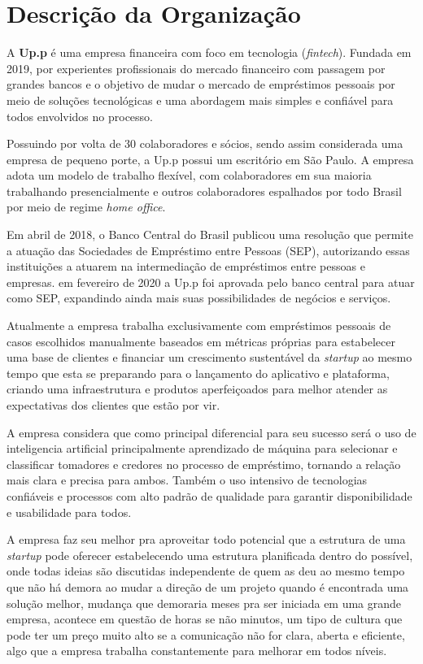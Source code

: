 \documentclass{ufscar}
\begin{document}
\section{Descrição da Organização}

A \textbf{Up.p} é uma empresa financeira com foco em tecnologia (\textit{fintech}). Fundada em 2019, por experientes profissionais do mercado financeiro com passagem por grandes bancos e o objetivo de mudar o mercado de empréstimos pessoais por meio de soluções tecnológicas e uma abordagem mais simples e confiável para todos envolvidos no processo.%

Possuindo por volta de 30 colaboradores e sócios, sendo assim considerada uma empresa de pequeno porte, a Up.p possui um escritório em São Paulo. A empresa adota um modelo de trabalho flexível, com colaboradores em sua maioria trabalhando presencialmente  e outros colaboradores espalhados por todo Brasil por meio de regime \textit{home office}.

Em abril de 2018, o Banco Central do Brasil publicou uma resolução que permite a atuação das Sociedades de Empréstimo entre Pessoas (SEP), autorizando essas instituições a atuarem na intermediação de empréstimos entre pessoas e empresas. em fevereiro de 2020 a Up.p foi aprovada pelo banco central para atuar como SEP, expandindo ainda mais suas possibilidades de negócios e serviços.

Atualmente a empresa trabalha exclusivamente com empréstimos pessoais de casos escolhidos manualmente baseados em métricas próprias para estabelecer uma base de clientes e financiar um crescimento sustentável da \textit{startup} ao mesmo tempo que esta se preparando para o lançamento do aplicativo e plataforma, criando uma infraestrutura e produtos aperfeiçoados para melhor atender as expectativas dos clientes que estão por vir.

A empresa considera que como principal diferencial para seu sucesso será o uso de inteligencia artificial principalmente aprendizado de máquina para selecionar e classificar tomadores e credores no processo de empréstimo, tornando a relação mais clara e precisa para ambos. Também  o uso intensivo de tecnologias confiáveis e processos com alto padrão de qualidade para garantir disponibilidade e usabilidade para todos. 

A empresa faz seu melhor pra aproveitar todo potencial que a estrutura de uma \textit{startup} pode oferecer estabelecendo uma estrutura planificada dentro do possível, onde todas ideias são discutidas independente de quem as deu ao mesmo tempo que não há demora ao mudar a direção de um projeto quando é encontrada uma solução melhor, mudança que demoraria meses pra ser iniciada em uma grande empresa, acontece em questão de horas se não minutos, um tipo de cultura que pode ter um preço muito alto se a comunicação não for clara, aberta e eficiente, algo que a empresa trabalha constantemente para melhorar em todos níveis.
\end{document}
